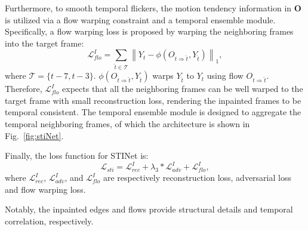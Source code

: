 
Furthermore, to smooth temporal flickers, the motion tendency information in $\boldsymbol{O}$ is utilized via a flow warping constraint and a temporal ensemble module.
Specifically, a flow warping loss is proposed by warping the neighboring frames into the target frame:
\begin{equation}
	\label{eq:inp_flow}
	\mathcal{L}^I_{flo}=\sum_{\widehat{t}\in\mathcal{T}}\left\| Y_t-\phi(O_{t\Rightarrow \widehat{t}},Y_{\widehat{t}}) \right\|_1,
\end{equation}
where $\mathcal{T}=\{t-7,t-3\}$. $\phi(O_{t\Rightarrow \widehat{t}},Y_{\widehat{t}})$ warps $Y_{\widehat{t}}$ to $Y_{t}$ using flow $O_{t\Rightarrow \widehat{t}}$.
Therefore, $\mathcal{L}^I_{flo}$ expects that all the neighboring frames can be well warped to the target frame with small reconstruction loss, rendering the inpainted frames to be temporal consistent.
The temporal ensemble module is designed to aggregate the temporal neighboring frames, of which the architecture is shown in Fig.~\ref{fig:stiNet}.


Finally, the loss function for STINet is:
\begin{equation}
	\label{eq:inpain_all}
	\mathcal{L}_{sti}=\mathcal{L}^{I}_{rec}+\lambda_3 * \mathcal{L}^I_{adv}+ \mathcal{L}^I_{flo},
\end{equation}
where $\mathcal{L}^{I}_{rec}$, $\mathcal{L}^I_{adv}$, and $\mathcal{L}^I_{flo}$ are respectively reconstruction loss, adversarial loss and flow warping loss.

Notably, the inpainted edges and flows provide structural details and temporal correlation, respectively. 

















